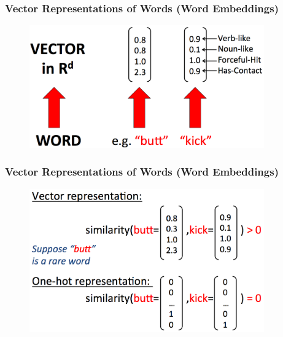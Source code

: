 \documentclass{beamer}
\begin{document}
\begin{frame}
\frametitle{Vector Representations of Words (Word Embeddings)}
\begin{figure}[htbp]
\begin{center}
\includegraphics[width=0.9\textwidth]{figs/word_embedding1}
\end{center}
\end{figure}
\end{frame}

\begin{frame}
\frametitle{Vector Representations of Words (Word Embeddings)}
\begin{figure}[htbp]
\begin{center}
\includegraphics[width=0.9\textwidth]{figs/word_embedding2}
\end{center}
\end{figure}
\end{frame}
\end{document}
